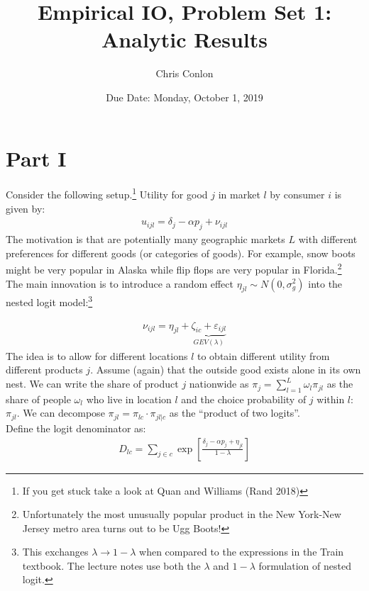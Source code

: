 \documentclass[12pt]{article}
\begin{document}
\title{Empirical IO, Problem Set 1: \\
Analytic Results}
\author{Chris Conlon}
\date{Due Date: Monday, October 1, 2019}
\maketitle

\section*{\normalsize Part I}
Consider the following setup.\footnote{If you get stuck take a look at Quan and Williams (Rand 2018)} Utility for good $j$ in market $l$ by consumer $i$ is given by:
\begin{eqnarray*}
u_{ijl} = \delta_j - \alpha p_j + \nu_{ijl}
\end{eqnarray*}
The motivation is that are potentially many geographic markets $L$ with different preferences for different goods (or categories of goods). For example, snow boots might be very popular in Alaska while flip flops are very popular in Florida.\footnote{Unfortunately the most unusually popular product in the New York-New Jersey metro area turns out to be Ugg Boots!}\\

\noindent The main innovation is to introduce a random effect $\eta_{jl} \sim N(0,\sigma_g^2)$ into the nested logit model:\footnote{This exchanges $\lambda \rightarrow 1-\lambda$ when compared to the expressions in the Train textbook. The lecture notes use both the $\lambda$ and $1-\lambda$ formulation of nested logit.}

\begin{eqnarray*}
\nu_{ijl} = \eta_{jl}+ \underbrace{\zeta_{ic} + \varepsilon_{ijl}}_{GEV(\lambda)}
\end{eqnarray*}
The idea is to allow for different locations $l$ to obtain different utility from different products $j$. Assume (again) that the outside good exists alone in its own nest. We can write the share of product $j$ nationwide as $\pi_j = \sum_{l=1}^L \omega_l \pi_{jl}$ as the share of people $\omega_l$ who live in location $l$ and the choice probability of $j$ within $l$: $\pi_{jl}$. We can decompose $\pi_{jl} =  \pi_{lc} \cdot \pi_{jl|c}$ as the ``product of two logits''.\\

Define the logit denominator as:
\begin{eqnarray*}
D_{lc} = \sum_{j \in c} \exp \left[\frac{\delta_j  -\alpha p_j+ \eta_{jl}}{1-\lambda}\right]
\end{eqnarray*}
\end{document}
